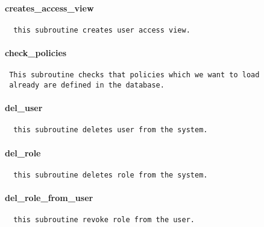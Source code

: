\paragraph*{creates\_access\_view\label{Apiis::Auth::AccessControl_--_used_by_the_runall_pl_and_access_control_pl_scripts_to_define_user_access_rights_creates_access_view}}
\begin{verbatim}
  this subroutine creates user access view.
\end{verbatim}
\paragraph*{check\_policies\label{Apiis::Auth::AccessControl_--_used_by_the_runall_pl_and_access_control_pl_scripts_to_define_user_access_rights_check_policies}}
\begin{verbatim}
 This subroutine checks that policies which we want to load 
 already are defined in the database.
\end{verbatim}
\paragraph*{del\_user\label{Apiis::Auth::AccessControl_--_used_by_the_runall_pl_and_access_control_pl_scripts_to_define_user_access_rights_del_user}}
\begin{verbatim}
  this subroutine deletes user from the system.
\end{verbatim}
\paragraph*{del\_role\label{Apiis::Auth::AccessControl_--_used_by_the_runall_pl_and_access_control_pl_scripts_to_define_user_access_rights_del_role}}
\begin{verbatim}
  this subroutine deletes role from the system.
\end{verbatim}
\paragraph*{del\_role\_from\_user\label{Apiis::Auth::AccessControl_--_used_by_the_runall_pl_and_access_control_pl_scripts_to_define_user_access_rights_del_role_from_user}}
\begin{verbatim}
  this subroutine revoke role from the user.
\end{verbatim}
